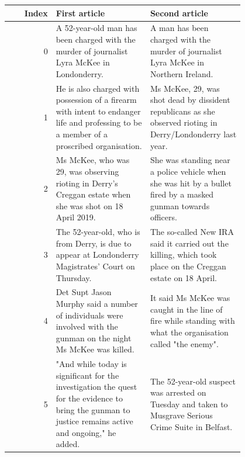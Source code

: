 \begin{table}[!htbp]
        \centering
        \begin{tabular}{r | p{0.4\linewidth} | p{0.4\linewidth} }
        Index & First article & Second article \\
        \hline
        0\vspace{-2px} & \tiny{A 52-year-old man has been charged with the murder of journalist Lyra McKee in Londonderry.}\vspace{-2px} & \tiny{A man has been charged with the murder of journalist Lyra McKee in Northern Ireland.}\vspace{-2px}\\
        1\vspace{-2px} & \tiny{He is also charged with possession of a firearm with intent to endanger life and professing to be a member of a proscribed organisation.}\vspace{-2px} & \tiny{Ms McKee, 29, was shot dead by dissident republicans as she observed rioting in Derry/Londonderry last year.}\vspace{-2px}\\
        2\vspace{-2px} & \tiny{Ms McKee, who was 29, was observing rioting in Derry's Creggan estate when she was shot on 18 April 2019. }\vspace{-2px}& \tiny{She was standing near a police vehicle when she was hit by a bullet fired by a masked gunman towards officers.}\vspace{-2px}\\
        3\vspace{-2px} & \tiny{The 52-year-old, who is from Derry, is due to appear at Londonderry Magistrates' Court on Thursday.}\vspace{-2px} & \tiny{The so-called New IRA said it carried out the killing, which took place on the Creggan estate on 18 April.}\vspace{-2px}\\
        4\vspace{-2px} & \tiny{Det Supt Jason Murphy said a number of individuals were involved with the gunman on the night Ms McKee was killed.}\vspace{-2px} & \tiny{It said Ms McKee was caught in the line of fire while standing with what the organisation called "the enemy".}\vspace{-2px}\\
        5\vspace{-2px} & \tiny{"And while today is significant for the investigation the quest for the evidence to bring the gunman to justice remains active and ongoing," he added.}\vspace{-2px} & \tiny{The 52-year-old suspect was arrested on Tuesday and taken to Musgrave Serious Crime Suite in Belfast.}\vspace{-2px}\\

\end{tabular}
\end{table}
